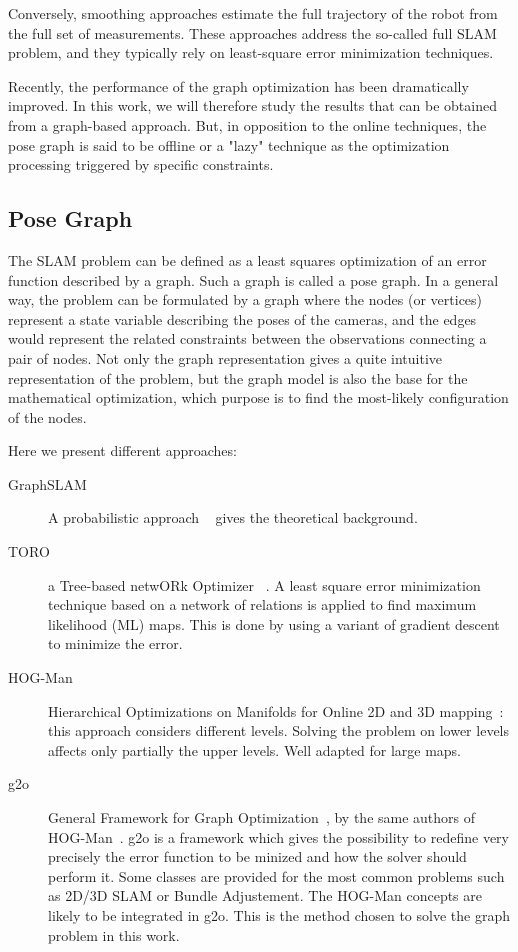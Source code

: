 Conversely, smoothing approaches estimate the full trajectory of the robot from the full set of measurements. These approaches address the so-called full SLAM problem, and they typically rely on least-square error minimization techniques.

Recently, the performance of the graph optimization has been dramatically improved. In this work, we will therefore study the results that can be obtained from a graph-based approach. But, in opposition to the online techniques, the pose graph is said to be offline or a "lazy" technique as the optimization processing triggered by specific constraints.

\subsection{Pose Graph}

The SLAM problem can be defined as a least squares optimization of an error function described by a graph. Such a graph is called a pose graph. In a general way, the problem can be formulated by a graph where the nodes (or vertices) represent a state variable describing the poses of the cameras, and the edges would represent the related constraints between the observations connecting a pair of nodes. Not only the graph representation gives a quite intuitive representation of the problem, but the graph model is also the base for the mathematical optimization, which purpose is to find the most-likely configuration of the nodes.

Here we present different approaches:

\begin{description}
\item[GraphSLAM] A probabilistic approach ~\cite{Thrun_2005} gives the theoretical background.
\item[TORO] a Tree-based netwORk Optimizer ~\cite{grisetti07rss}. A least square error minimization technique based on a network of relations is applied to find maximum likelihood (ML) maps. This is done by using a variant of gradient descent to minimize the error.
\item[HOG-Man] Hierarchical Optimizations on Manifolds for Online 2D and 3D mapping~\cite{hogman_2010}: this approach considers different levels. Solving the problem on lower levels affects only partially the upper levels. Well adapted for large maps.
\item[g2o] General Framework for Graph Optimization~\cite{g2o_2011}, by the same authors of HOG-Man~\cite{hogman_2010}. g2o is a framework which gives the possibility to redefine very precisely the error function to be minized and how the solver should perform it. Some classes are provided for the most common problems such as 2D/3D SLAM or Bundle Adjustement. The HOG-Man concepts are likely to be integrated in g2o. This is the method chosen to solve the graph problem in this work.
\end{description}

